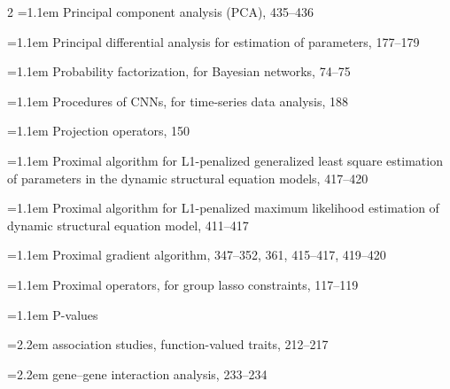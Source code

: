 \begin{multicols}{2}
\noindent\hangindent=1.1em Principal component analysis (PCA), 435--436\par
\noindent\hangindent=1.1em Principal differential analysis for estimation of parameters, 177--179\par
\noindent\hangindent=1.1em Probability factorization, for Bayesian networks, 74--75\par
\noindent\hangindent=1.1em Procedures of CNNs, for time-series data analysis, 188\par
\noindent\hangindent=1.1em Projection operators, 150\par
\noindent\hangindent=1.1em Proximal algorithm for L1-penalized generalized least square estimation of parameters in the dynamic structural equation models, 417--420\par
\noindent\hangindent=1.1em Proximal algorithm for L1-penalized maximum likelihood estimation of dynamic structural equation model, 411--417\par
\noindent\hangindent=1.1em Proximal gradient algorithm, 347--352, 361, 415--417, 419--420\par
\noindent\hangindent=1.1em Proximal operators, for group lasso constraints, 117--119\par
\noindent\hangindent=1.1em P-values\par
\noindent\hangindent=2.2em \hspace*{1.1em}association studies, function-valued traits, 212--217\par
\noindent\hangindent=2.2em \hspace*{1.1em}gene--gene interaction analysis, 233--234\par


\end{multicols}
